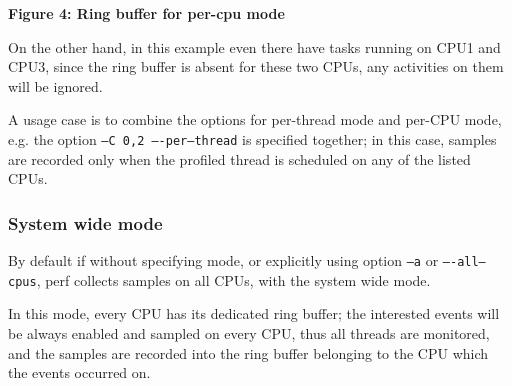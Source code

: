 \documentclass[11pt]{diazessay} %
\def\code#1{\texttt{#1}}
\begin{document}
\begin{center}
\par
\textbf{Figure 4: Ring buffer for per-cpu mode}
\end{center}

On the other hand, in this example even there have tasks running on CPU1 and CPU3, since the ring buffer is absent for these two CPUs, any activities on them will be ignored.

A usage case is to combine the options for per-thread mode and per-CPU mode, e.g. the option \code{--C 0,2 ----per--thread} is specified together; in this case, samples are recorded only when the profiled thread is scheduled on any of the listed CPUs.

\subsubsection*{System wide mode}

By default if without specifying mode, or explicitly using option \code{--a} or \code{----all--cpus}, perf collects samples on all CPUs, with the system wide mode.

In this mode, every CPU has its dedicated ring buffer; the interested events will be always enabled and sampled on every CPU, thus all threads are monitored, and the samples are recorded into the ring buffer belonging to the CPU which the events occurred on.
\end{document}
